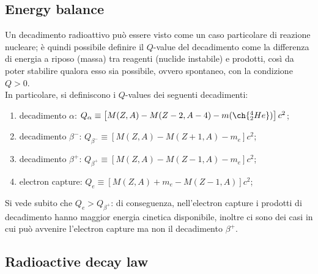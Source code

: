 \subsection{Energy balance}

Un decadimento radioattivo può essere visto come un caso particolare di reazione nucleare; è quindi possibile definire il $ Q $-value del decadimento come la differenza di energia a riposo (massa) tra reagenti (nuclide instabile) e prodotti, così da poter stabilire qualora esso sia possibile, ovvero spontaneo, con la condizione $ Q > 0 $.\\
In particolare, si definiscono i $ Q $-values dei seguenti decadimenti:
\begin{enumerate}
  \item decadimento $ \alpha $: $ Q_{\alpha} \equiv \left[ M(Z,A) - M(Z-2,A-4) - m(\ch{^4_2 He}) \right] c^2 $;
  \item decadimento $ \beta^- $: $ Q_{\beta^-} \equiv \left[ M(Z,A) - M(Z+1,A) - m_e \right] c^2 $;
  \item decadimento $ \beta^+ $: $ Q_{\beta^+} \equiv \left[ M(Z,A) - M(Z-1,A) - m_e \right] c^2 $;
  \item electron capture: $ Q_{e} \equiv \left[ M(Z,A) + m_e - M(Z-1,A) \right] c^2 $;
\end{enumerate}
Si vede subito che $ Q_e > Q_{\beta^+} $: di conseguenza, nell'electron capture i prodotti di decadimento hanno maggior energia cinetica disponibile, inoltre ci sono dei casi in cui può avvenire l'electron capture ma non il decadimento $ \beta^+ $.

\subsection{Radioactive decay law}

